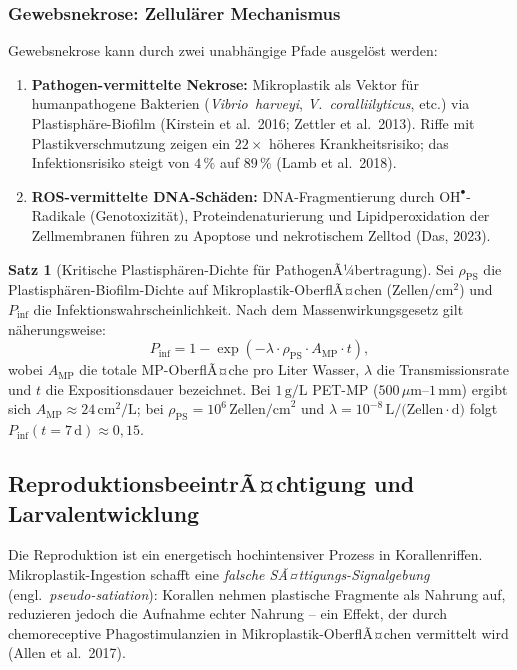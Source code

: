 ﻿\documentclass[12pt,a4paper]{article}
\theoremstyle{definition}
\newtheorem{satz}{Satz}
\theoremstyle{remark}
\newcommand{\MP}{Mikroplastik}
\begin{document}
\subsubsection{Gewebsnekrose: Zellul\"arer Mechanismus}

Gewebsnekrose kann durch zwei unabh\"angige Pfade ausgel\"ost werden:
\begin{enumerate}[leftmargin=*]
  \item \textbf{Pathogen-vermittelte Nekrose:} \MP{} als Vektor f\"ur
    humanpathogene Bakterien (\textit{Vibrio~harveyi}, \textit{V.~coralliilyticus},
    etc.) via Plastisph\"are-Biofilm (Kirstein et al.\ 2016; Zettler et al.\ 2013).
    Riffe mit Plastikverschmutzung zeigen ein $22\times$ h\"oheres Krankheitsrisiko;
    das Infektionsrisiko steigt von $4\,\%$ auf $89\,\%$ (Lamb et al.\ 2018).
  \item \textbf{ROS-vermittelte DNA-Sch\"aden:} DNA-Fragmentierung durch
    $\text{OH}^\bullet$-Radikale (Genotoxizit\"at), Proteindenaturierung und
    Lipidperoxidation der Zellmembranen f\"uhren zu Apoptose und nekrotischem
    Zelltod (Das, 2023).
\end{enumerate}

\begin{satz}[Kritische Plastisph\"aren-Dichte f\"ur PathogenÃ¼bertragung]
Sei $\rho_{\text{PS}}$ die Plastisph\"aren-Biofilm-Dichte auf \MP{}-OberflÃ¤chen
(Zellen/cm$^2$) und $P_{\text{inf}}$ die Infektionswahrscheinlichkeit. Nach
dem Massenwirkungsgesetz gilt n\"aherungsweise:
\begin{equation}
  P_{\text{inf}} = 1 - \exp\left(-\lambda \cdot \rho_{\text{PS}} \cdot A_{\text{MP}} \cdot t\right),
  \label{eq:pathogen_prob}
\end{equation}
wobei $A_{\text{MP}}$ die totale MP-OberflÃ¤che pro Liter Wasser,
$\lambda$ die Transmissionsrate und $t$ die Expositionsdauer bezeichnet.
Bei $1\,\text{g/L}$ PET-MP ($500\,\mu$m--$1\,\text{mm}$) ergibt sich
$A_{\text{MP}} \approx 24\,\text{cm}^2/\text{L}$;
bei $\rho_{\text{PS}} = 10^6\,\text{Zellen/cm}^2$ und
$\lambda = 10^{-8}\,\text{L/(Zellen}\cdot\text{d})$ folgt
$P_{\text{inf}}(t=7\,\text{d}) \approx 0{,}15$.
\end{satz}

\subsection{ReproduktionsbeeintrÃ¤chtigung und Larvalentwicklung}
\label{subsec:reproduktion}

Die Reproduktion ist ein energetisch hochintensiver Prozess in Korallenriffen.
\MP{}-Ingestion schafft eine \textit{falsche SÃ¤ttigungs-Signalgebung} (engl.\
\textit{pseudo-satiation}): Korallen nehmen plastische Fragmente als Nahrung auf,
reduzieren jedoch die Aufnahme echter Nahrung -- ein Effekt, der durch
chemoreceptive Phagostimulanzien in \MP{}-OberflÃ¤chen vermittelt wird
(Allen et al.\ 2017).
\end{document}
